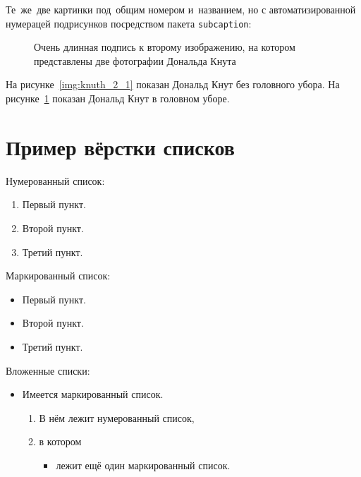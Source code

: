 Те~же~две картинки под~общим номером и~названием, но с автоматизированной нумерацей подрисунков посредством пакета \verb|subcaption|:
\begin{figure}[ht]
    
    \caption{Очень длинная подпись к второму изображению, на котором представлены две фотографии Дональда Кнута} %
    \label{img:knuth_2}  
\end{figure}


На рисунке~\ref{img:knuth_2_1} показан Дональд Кнут без головного убора. На рисунке~\ref{img:knuth_2}  показан Дональд Кнут в головном уборе.

\section{Пример вёрстки списков} \label{sect2_3}

\noindent Нумерованный список:
\begin{enumerate}
  \item Первый пункт.
  \item Второй пункт.
  \item Третий пункт.
\end{enumerate}

\noindent Маркированный список:
\begin{itemize}
  \item Первый пункт.
  \item Второй пункт.
  \item Третий пункт.
\end{itemize}

\noindent Вложенные списки:
\begin{itemize}
  \item Имеется маркированный список.
  \begin{enumerate}
    \item В нём лежит нумерованный список,
    \item в котором
    \begin{itemize}
      \item лежит ещё один маркированный список.
    \end{itemize}    
  \end{enumerate}
\end{itemize}


